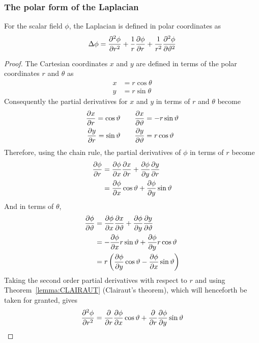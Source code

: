 \subsubsection{The polar form of the Laplacian}
\begin{lemma}
    For the scalar field $\phi$, the Laplacian is defined in polar coordinates as
    $$\Delta\phi=\pdv[2]{\phi}{r}+\frac{1}{r}\pdv{\phi}{r}+\frac{1}{r^2}\pdv[2]{\phi}{\vartheta}$$

    \begin{proof}
        The Cartesian coordinates $x$ and $y$ are defined in terms of the polar coordinates $r$ and $\theta$ as
        \begin{align*}
            x&=r\cos\theta\\
            y&=r\sin\theta
        \end{align*}
        Consequently the partial derivatives for $x$ and $y$ in terms of $r$ and $\theta$ become
        \begin{align*}
            \pdv{x}{r}=\cos\vartheta\quad&\quad\pdv{x}{\vartheta}=-r\sin\vartheta\\
            \pdv{y}{r}=\sin\vartheta\quad&\quad\pdv{y}{\vartheta}=r\cos\vartheta
        \end{align*} 
        Therefore, using the chain rule, the partial derivatives of $\phi$ in terms of $r$ become
        \begin{align}
            \notag\pdv{\phi}{r}&=\pdv{\phi}{x}\pdv{x}{r}+\pdv{\phi}{y}\pdv{y}{r}\\
            \label{equation:polar-laplacian:1}&=\pdv{\phi}{x}\cos\vartheta+\pdv{\phi}{y}\sin\vartheta
        \end{align}
        And in terms of $\theta$,
        \begin{align}
            \notag\pdv{\phi}{\vartheta}&=\pdv{\phi}{x}\pdv{x}{\vartheta}+\pdv{\phi}{y}\pdv{y}{\vartheta}\\
            \notag&=-\pdv{\phi}{x}r\sin\vartheta+\pdv{\phi}{y}r\cos\vartheta\\
            \label{equation:polar-laplacian:2}&=r\left(\pdv{\phi}{y}\cos\vartheta-\pdv{\phi}{x}\sin\vartheta\right)
        \end{align}
        Taking the second order partial derivatives with respect to $r$ and using Theorem~\ref{lemma:CLAIRAUT} (Clairaut's theorem), which will henceforth be taken for granted, gives
        \begin{align*}
            \pdv[2]{\phi}{r}&=\pdv{r}\pdv{\phi}{x}\cos\theta+\pdv{r}\pdv{\phi}{y}\sin\theta\\

\end{align*}
\end{proof}
\end{lemma}
